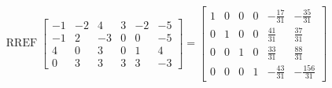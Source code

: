 \begin{exerciseAnswer} 


\[\operatorname{RREF} \left[\begin{array}{cccccc}
-1 & -2 & 4 & 3 & -2 & -5 \\
-1 & 2 & -3 & 0 & 0 & -5 \\
4 & 0 & 3 & 0 & 1 & 4 \\
0 & 3 & 3 & 3 & 3 & -3
\end{array}\right] = \left[\begin{array}{cccccc}
1 & 0 & 0 & 0 & -\frac{17}{31} & -\frac{35}{31} \\
0 & 1 & 0 & 0 & \frac{41}{31} & \frac{37}{31} \\
0 & 0 & 1 & 0 & \frac{33}{31} & \frac{88}{31} \\
0 & 0 & 0 & 1 & -\frac{43}{31} & -\frac{156}{31}
\end{array}\right] \]



\end{exerciseAnswer}
